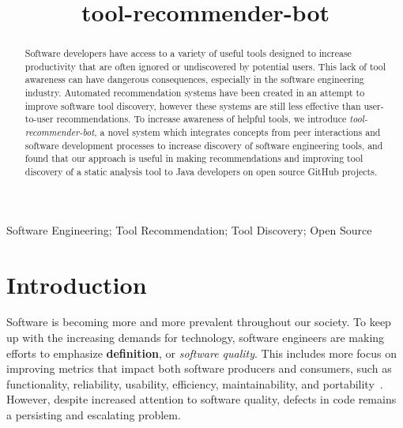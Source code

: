 \documentclass[conference]{IEEEtran}
\newcommand{\tool}{tool-recommender-bot}
\begin{document}

\title{\tool}

\author{
}

\maketitle
\begin{abstract}
Software developers have access to a variety of useful tools designed to increase productivity that are often ignored or undiscovered by potential users. This lack of tool awareness can have dangerous consequences, especially in the software engineering industry. Automated recommendation systems have been created in an attempt to improve software tool discovery, however these systems are still less effective than user-to-user recommendations. To increase awareness of helpful tools, we introduce \textit{\tool}, a novel system which integrates concepts from peer interactions and software development processes to increase discovery of software engineering tools, and found that our approach is useful in making recommendations and improving tool discovery of a static analysis tool to Java developers on open source GitHub projects.
\end{abstract}

\begin{IEEEkeywords}
Software Engineering; Tool Recommendation; Tool Discovery; Open Source
\end{IEEEkeywords}

\section{Introduction}

Software is becoming more and more prevalent throughout our society. To keep up with the increasing demands for technology, software engineers are making efforts to emphasize \textbf{definition}, or \textit{software quality}. This includes more focus on improving metrics that impact both software producers and consumers, such as functionality, reliability, usability, efficiency, maintainability, and portability~\cite{KitchenhamQualityTarget}. However, despite increased attention to software quality, defects in code remains a persisting and escalating problem. 
\end{document}

